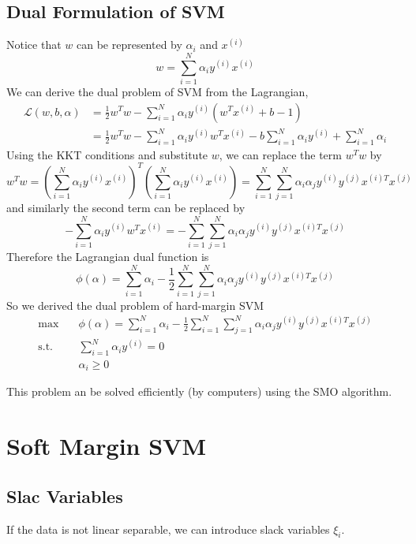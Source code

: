     \subsection{Dual Formulation of SVM}
        Notice that $w$ can be represented by $\alpha_i$ and $x^{(i)}$
        \[ w = \sum_{i=1}^N \alpha_i y^{(i)}x^{(i)} \]
        We can derive the dual problem of SVM from the Lagrangian,
        \begin{align*}
            \mathcal{L}(w,b,\alpha) &= \frac{1}{2}w^Tw - \sum_{i=1}^N \alpha_i y^{(i)}(w^Tx^{(i)} + b - 1)\\
            &= \frac{1}{2}w^Tw - \sum_{i=1}^N \alpha_i y^{(i)}w^Tx^{(i)} -b\sum_{i=1}^N \alpha_i y^{(i)} + \sum_{i=1}^N \alpha_i
        \end{align*}
        Using the KKT conditions and substitute $w$, we can replace the term $w^Tw$ by
        \[ w^Tw = \left(\sum_{i=1}^N \alpha_i y^{(i)}x^{(i)}\right)^T\left(\sum_{i=1}^N \alpha_i y^{(i)}x^{(i)}\right) = \sum_{i=1}^N\sum_{j=1}^N \alpha_i\alpha_j y^{(i)}y^{(j)} x^{(i)T}x^{(j)} \]
        and similarly the second term can be replaced by
        \[ -\sum_{i=1}^N \alpha_iy^{(i)}w^Tx^{(i)} = -\sum_{i=1}^N\sum_{j=1}^N \alpha_i\alpha_j y^{(i)}y^{(j)} x^{(i)T}x^{(j)} \]
        Therefore the Lagrangian dual function is
        \[ \phi(\alpha) = \sum_{i=1}^N\alpha_i - \frac{1}{2}\sum_{i=1}^N\sum_{j=1}^N \alpha_i\alpha_j y^{(i)}y^{(j)} x^{(i)T}x^{(j)} \]
        So we derived the dual problem of hard-margin SVM
        \begin{align*}
            \max \quad &\phi(\alpha) = \sum_{i=1}^N\alpha_i - \frac{1}{2}\sum_{i=1}^N\sum_{j=1}^N \alpha_i\alpha_j y^{(i)}y^{(j)} x^{(i)T}x^{(j)}\\
            \text{s.t.} \quad & \sum_{i=1}^N \alpha_i y^{(i)} = 0\\
            \quad & \alpha_i \ge 0
        \end{align*}
        \begin{remark}
            This problem an be solved efficiently (by computers) using the SMO algorithm.
        \end{remark}


\section{Soft Margin SVM}
    \subsection{Slac Variables}
        If the data is not linear separable, we can introduce slack variables $\xi_i$.

